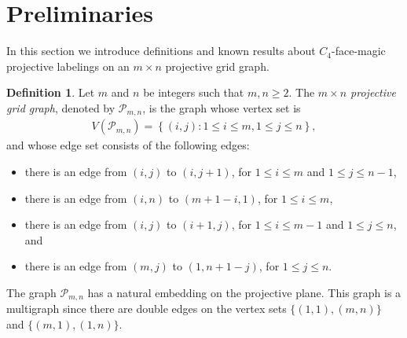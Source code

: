 \documentclass[12pt]{amsart}
\theoremstyle{definition}
\newtheorem{definition}{Definition}
\theoremstyle{plain}
\begin{document}
\section{Preliminaries} \label{S:preliminaries}

In this section we introduce definitions and known results about $C_4$-face-magic projective labelings on an $m \times n$ projective grid graph.

\begin{definition}
Let $m$ and $n$ be integers such that $m,n\geqslant 2$.
The {\it $m \times n$ projective grid graph}, denoted by $\mathcal{P}_{m,n}$, is the graph whose vertex set is
\begin{align*}
V\left( \mathcal{P}_{m,n} \right)
=\left\{ \left( i,j\right) :1\leqslant i\leqslant m,1\leqslant j\leqslant n\right\},
\end{align*}
and whose edge set consists of the following edges:
\begin{itemize}
\item there is an edge from $(i,j)$ to $(i,j+1)$, for $1\leqslant i \leqslant m$ and $1\leqslant j \leqslant n-1$,
\item there is an edge from $(i,n)$ to $(m+1-i,1)$, for $1\leqslant i \leqslant m$,
\item there is an edge from $(i,j)$ to $(i+1,j)$, for $1\leqslant i \leqslant m-1$ and $1\leqslant j \leqslant n$, and
\item there is an edge from $(m,j)$ to $(1,n+1-j)$, for $1\leqslant j \leqslant n$.
\end{itemize}
The graph $\mathcal{P}_{m,n}$ has a natural embedding on the projective plane.
This graph is a multigraph since there are double edges on the vertex sets $\{ (1,1), (m,n)\}$ and $\{ (m,1), (1,n)\}$.
\end{definition}
\end{document}

